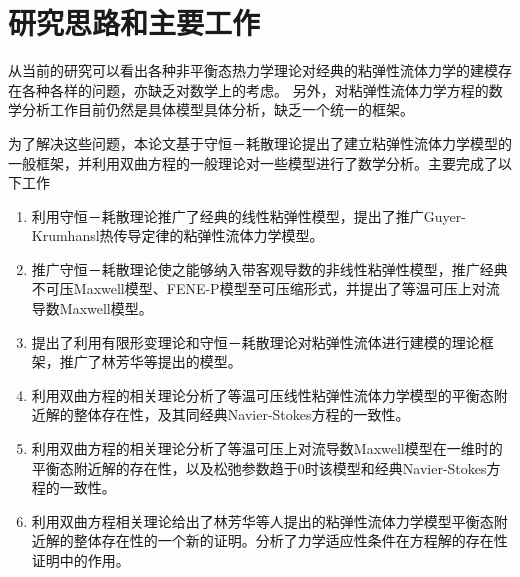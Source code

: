 \section{研究思路和主要工作}
从当前的研究可以看出各种非平衡态热力学理论对经典的粘弹性流体力学的建模存在各种各样的问题，亦缺乏对数学上的考虑。%
另外，对粘弹性流体力学方程的数学分析工作目前仍然是具体模型具体分析，缺乏一个统一的框架。

为了解决这些问题，本论文基于守恒－耗散理论提出了建立粘弹性流体力学模型的一般框架，并利用双曲方程的一般理论对一些模型进行了数学分析。主要完成了以下工作
\begin{enumerate}
\item 利用守恒－耗散理论推广了经典的线性粘弹性模型，提出了推广Guyer-Krumhansl热传导定律的粘弹性流体力学模型。
\item 推广守恒－耗散理论使之能够纳入带客观导数的非线性粘弹性模型，推广经典不可压Maxwell模型、FENE-P模型至可压缩形式，并提出了等温可压上对流导数Maxwell模型。
\item 提出了利用有限形变理论和守恒－耗散理论对粘弹性流体进行建模的理论框架，推广了林芳华等提出的模型。
\item 利用双曲方程的相关理论分析了等温可压线性粘弹性流体力学模型的平衡态附近解的整体存在性，及其同经典Navier-Stokes方程的一致性。
\item 利用双曲方程的相关理论分析了等温可压上对流导数Maxwell模型在一维时的平衡态附近解的存在性，以及松弛参数趋于$0$时该模型和经典Navier-Stokes方程的一致性。
\item 利用双曲方程相关理论给出了林芳华等人提出的粘弹性流体力学模型平衡态附近解的整体存在性的一个新的证明。分析了力学适应性条件在方程解的存在性证明中的作用。
\end{enumerate}


